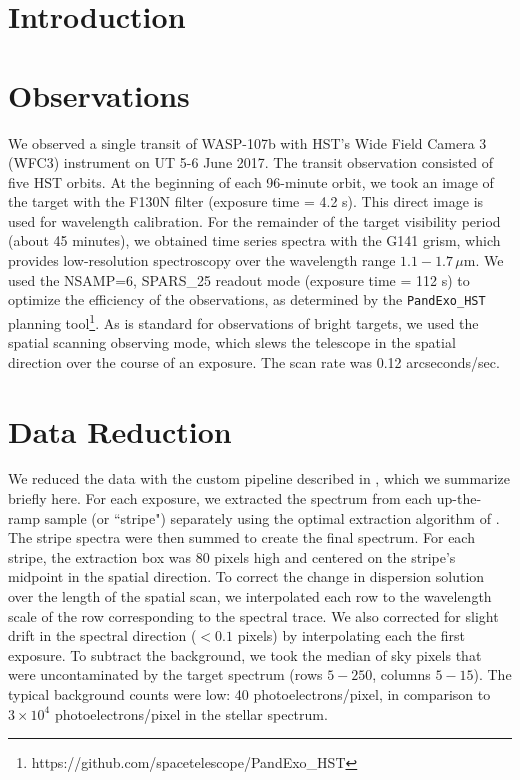 \documentclass[twocolumn]{aastex61}
\begin{document}



\section{Introduction} \label{sec:intro}

\section{Observations}
We observed a single transit of WASP-107b with HST's Wide Field Camera 3 (WFC3) instrument on UT 5-6 June 2017.  The transit observation consisted of five HST orbits. At the beginning of each 96-minute orbit, we took an image of the target with the F130N filter (exposure time = 4.2 s). This direct image is used for wavelength calibration. For the remainder of the target visibility period (about 45 minutes), we obtained time series spectra with the G141 grism, which provides low-resolution spectroscopy over the wavelength range $1.1 - 1.7\,\mu$m.  We used the NSAMP=6, SPARS\_25 readout mode (exposure time = 112 s) to optimize the efficiency of the observations, as determined by the \texttt{PandExo\_HST} planning tool\footnote{https://github.com/spacetelescope/PandExo\_HST}.  As is standard for observations of bright targets, we used the spatial scanning observing mode, which slews the telescope in the spatial direction over the course of an exposure. The scan rate was 0.12 arcseconds/sec.


\section{Data Reduction}
We reduced the data with the custom pipeline described in \cite{kreidberg14a}, which we summarize briefly here. For each exposure, we extracted the spectrum from each up-the-ramp sample (or ``stripe") separately using the optimal extraction algorithm of \cite{horne86}. The stripe spectra were then summed to create the final spectrum. For each stripe, the extraction box was 80 pixels high and centered on the stripe's midpoint in the spatial direction. To correct the change in dispersion solution over the length of the spatial scan, we interpolated each row to the wavelength scale of the row corresponding to the spectral trace. We also corrected for slight drift in the spectral direction ($<0.1$ pixels) by interpolating each the first exposure.  To subtract the background, we took the median of sky pixels that were uncontaminated by the target spectrum (rows $5-250$, columns $5-15$). The typical background counts were low: 40 photoelectrons/pixel, in comparison to $3\times10^4$ photoelectrons/pixel in the stellar spectrum.
\end{document}
